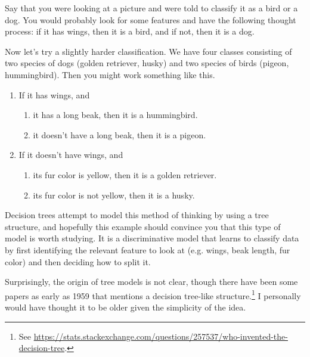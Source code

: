 Say that you were looking at a picture and were told to classify it as a bird or a dog. You would probably look for some features and have the following thought process: if it has wings, then it is a bird, and if not, then it is a dog. 

Now let's try a slightly harder classification. We have four classes consisting of two species of dogs (golden retriever, husky) and two species of birds (pigeon, hummingbird). Then you might work something like this. 
\begin{enumerate}
  \item If it has wings, and 
    \begin{enumerate}
      \item it has a long beak, then it is a hummingbird. 
      \item it doesn't have a long beak, then it is a pigeon. 
    \end{enumerate}
  \item If it doesn't have wings, and 
    \begin{enumerate}
      \item its fur color is yellow, then it is a golden retriever. 
      \item its fur color is not yellow, then it is a husky. 
    \end{enumerate}
\end{enumerate}

Decision trees attempt to model this method of thinking by using a tree structure, and hopefully this example should convince you that this type of model is worth studying. It is a discriminative model that learns to classify data by first identifying the relevant feature to look at (e.g. wings, beak length, fur color) and then deciding how to split it. 

Surprisingly, the origin of tree models is not clear, though there have been some papers as early as 1959 that mentions a decision tree-like structure.\footnote{See \href{https://stats.stackexchange.com/questions/257537/who-invented-the-decision-tree}{https://stats.stackexchange.com/questions/257537/who-invented-the-decision-tree}.} I personally would have thought it to be older given the simplicity of the idea. 

